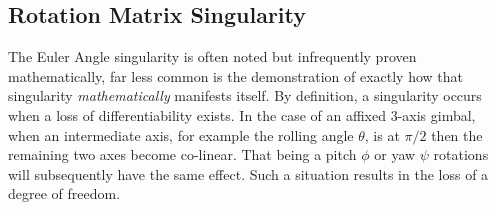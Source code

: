 \subsection{Rotation Matrix Singularity}\label{subsec:dynamics.rigidbody.singularity}
The Euler Angle singularity is often noted but infrequently proven mathematically, far less common is the demonstration of exactly how that singularity \emph{mathematically} manifests itself. By definition, a singularity occurs when a loss of differentiability exists. In the case of an affixed 3-axis gimbal, when an intermediate axis, for example the rolling angle $\theta$, is at $\pi/2$ then the remaining two axes become co-linear. That being a pitch $\phi$ or yaw $\psi$ rotations will subsequently have the same effect. Such a situation results in the loss of a degree of freedom.
